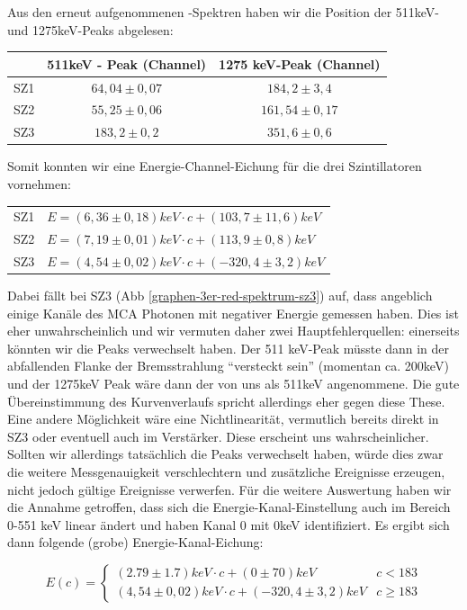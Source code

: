 Aus den erneut aufgenommenen \Na-Spektren haben wir die Position der 511keV- und 1275keV-Peaks abgelesen:  
\begin{center}
\begin{tabular}{lcc}
\toprule
 & 511keV - Peak (Channel) & 1275 keV-Peak (Channel) \\
\midrule
SZ1 & $64,04 \pm 0,07$ & $184,2 \pm 3,4$ \\
SZ2 & $55,25 \pm 0,06$ & $161,54 \pm 0,17$ \\
SZ3 & $183,2 \pm 0,2$ & $351,6 \pm 0,6$ \\
\bottomrule 
\end{tabular}
\end{center}

Somit konnten wir eine Energie-Channel-Eichung für die drei Szintillatoren vornehmen:

\begin{tabular}{ll}
 SZ1 & $E = (6,36 \pm 0,18) keV \cdot c + (103,7 \pm 11,6) keV$\\
 SZ2 & $E = (7,19 \pm 0,01) keV \cdot c + (113,9 \pm 0,8) keV$\\
 SZ3 & $E = (4,54 \pm 0,02) keV \cdot c + (-320,4 \pm 3,2) keV$ 
\end{tabular}

Dabei fällt bei SZ3 (Abb \ref{graphen-3er-red-spektrum-sz3}) auf, dass angeblich einige Kanäle des MCA Photonen mit negativer Energie gemessen haben. Dies ist eher unwahrscheinlich und wir vermuten daher zwei Hauptfehlerquellen: einerseits könnten wir die Peaks verwechselt haben. Der 511 keV-Peak müsste dann in der abfallenden Flanke der Bremsstrahlung "`versteckt sein"' (momentan ca. 200keV) und der 1275keV Peak wäre dann der von uns als 511keV angenommene. Die gute Übereinstimmung des Kurvenverlaufs spricht allerdings eher gegen diese These. Eine andere Möglichkeit wäre eine Nichtlinearität, vermutlich bereits direkt in SZ3 oder eventuell auch im Verstärker. Diese erscheint uns wahrscheinlicher. Sollten wir allerdings tatsächlich die Peaks verwechselt haben, würde dies zwar die weitere Messgenauigkeit verschlechtern und zusätzliche Ereignisse erzeugen, nicht jedoch gültige Ereignisse verwerfen. Für die weitere Auswertung haben wir die Annahme getroffen, dass sich die Energie-Kanal-Einstellung auch im Bereich 0-551 keV linear ändert und haben Kanal 0 mit 0keV identifiziert. Es ergibt sich dann folgende (grobe) Energie-Kanal-Eichung:

\begin{equation}
 E(c) = \begin{cases}
 ( 2.79 \pm 1.7) keV \cdot c + (0 \pm 70) keV & c < 183 \\
 (4,54 \pm 0,02) keV \cdot c + (-320,4 \pm 3,2) keV & c \geq 183
 \end{cases}
\end{equation}


